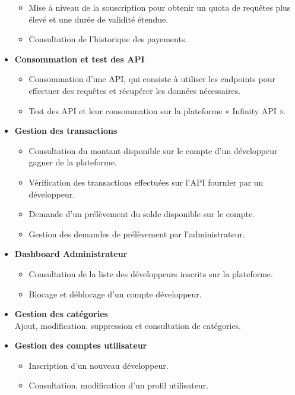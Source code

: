 \begin{itemize}
\begin{itemize}
            \item Mise à niveau de la souscription pour obtenir un quota de requêtes plus élevé et une durée de validité étendue.
            \item Consultation de l'historique des payements.
        \end{itemize}
        \item \textbf{Consommation et test des API}
        \begin{itemize}
            \item Consommation d’une API, qui consiste à utiliser les endpoints pour effectuer des requêtes et récupérer les données nécessaires.
            \item Test des API et leur consommation sur la plateforme « Infinity API ».          
        \end{itemize}
        \item \textbf{Gestion des transactions}
        \begin{itemize}
            \item Consultation du montant disponible sur le compte d’un développeur gagner de la plateforme.
            \item Vérification des transactions effectuées sur l’API fournier par un développeur.
            \item Demande d’un prélèvement du solde disponible sur le compte.
            \item Gestion des demandes de prélèvement par l'administrateur.    
        \end{itemize}
        \item \textbf{Dashboard Administrateur}
        \begin{itemize}
            \item Consultation de la liste des développeurs inscrits sur la plateforme.
            \item Blocage et déblocage d’un compte développeur.   
        \end{itemize}
        \item \textbf{Gestion des catégories} \\
         Ajout, modification, suppression et consultation de catégories.
         \item \textbf{Gestion des comptes utilisateur }
         \begin{itemize}
             \item Inscription d'un nouveau développeur.
             \item Consultation, modification d’un profil utilisateur.   

\end{itemize}
\end{itemize}
